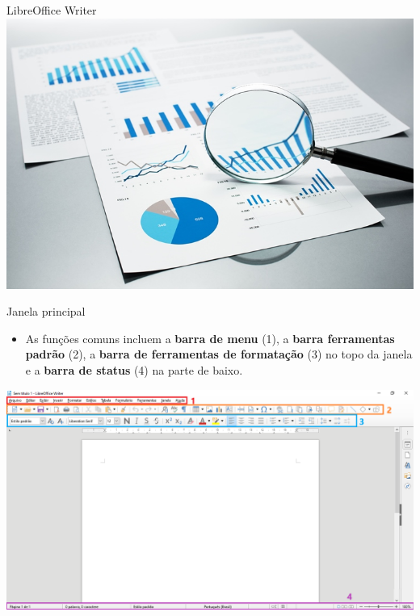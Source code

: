 \begin{frame}{LibreOffice Writer}
	\centering
	\includegraphics[width=0.9\linewidth]{Figuras/Ch04/fig0.1}
\end{frame}


\begin{frame}{Janela principal}
	\begin{block}{}
		\begin{itemize}
			\item As funções comuns incluem a \textbf{barra de menu} (1), a \textbf{barra ferramentas padrão} (2), a \textbf{barra de ferramentas de formatação} (3) no topo da janela e a \textbf{barra de status} (4) na parte de baixo.
		\end{itemize}
	\end{block}

	\centering
	\includegraphics[width=0.9\linewidth]{Figuras/Ch04/fig5}
\end{frame}


